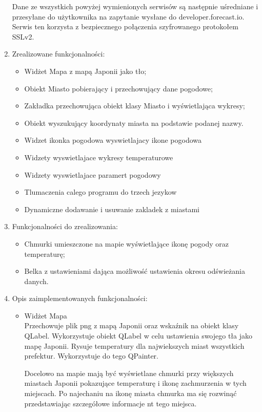 \documentclass[a4paper]{article}
\begin{document}
\begin{enumerate}
Dane ze wszystkich powyżej wymienionych serwisów są następnie uśredniane i przesyłane do użytkownika na zapytanie wysłane do developer.forecast.io. Serwis ten korzysta z bezpiecznego połączenia szyfrowanego protokołem SSLv2.


\item Zrealizowane funkcjonalności:
\begin{itemize}
\item Widżet Mapa z mapą Japonii jako tło;
\item Obiekt Miasto pobierający i przechowujący dane pogodowe;
\item Zakładka przechowująca obiekt klasy Miasto i wyświetlająca wykresy;
\item Obiekt wyszukujący koordynaty miasta na podstawie podanej nazwy.
\item Widzet ikonka pogodowa wyswietlajacy ikone pogodowa
\item Widzety wyswietlajace wykresy temperaturowe
\item Widzety wyswietlajace paramert pogodowy
\item Tlumaczenia calego programu do trzech jezykow
\item Dynamiczne dodawanie i usuwanie zakladek z miastami
\end{itemize}

\item Funkcjonalności do zrealizowania:
\begin{itemize}
\item Chmurki umieszczone na mapie wyświetlające ikonę pogody oraz temperaturę;
\item Belka z ustawieniami dająca możliwość ustawienia okresu odświeżania danych.
\end{itemize}

\item Opis zaimplementowanych funkcjonalności:
\begin{itemize}

\item Widżet Mapa\\
Przechowuje plik png z mapą Japonii oraz wskaźnik na obiekt klasy QLabel. Wykorzystuje obiekt QLabel w celu ustawienia swojego tła jako mapę Japonii. Rysuje temperatury dla najwiekszych miast wszystkich prefektur. Wykorzystuje do tego QPainter.

Docelowo na mapie mają być wyświetlane chmurki przy większych miastach Japonii pokazujące temperaturę i ikonę zachmurzenia w tych miejscach. Po najechaniu na ikonę miasta chmurka ma się rozwinąć przedstawiając szczegółowe informacje nt tego miejsca.


\end{itemize}
\end{enumerate}
\end{document}
